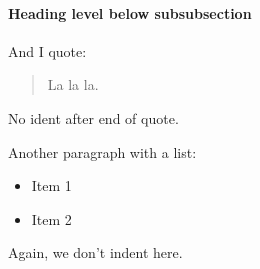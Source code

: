 \paragraph{Heading level below subsubsection}
\label{sec:paragraph}

And I quote: 
%
\begin{quote}
La la la.
\end{quote}
%
\noindent No ident after end of quote.  

Another paragraph with a list:
%
\begin{itemize}
%  
\item Item 1
%
\item Item 2
%
\end{itemize}
%
\noindent Again, we don't indent here.